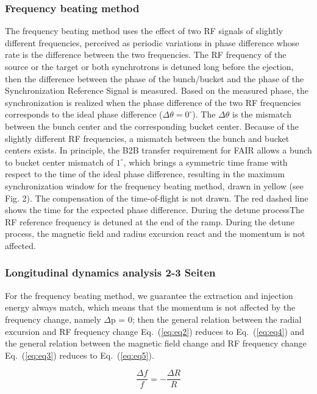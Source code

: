 \subsubsection{Frequency beating method}
The frequency beating method uses the effect of two RF signals of slightly different frequencies, perceived as periodic variations in phase difference whose rate is the difference between the two frequencies. The RF frequency of the source or the target or both synchrotrons is detuned long before the ejection, then the difference between the phase of the bunch/bucket and the phase of the Synchronization Reference Signal is measured. Based on the measured phase, the synchronization is realized when the phase difference of the two RF frequencies corresponds to the ideal phase difference ($\Delta \theta = 0^\circ$). The $\Delta \theta$ is the mismatch between the bunch center and the corresponding bucket center. Because of the slightly different RF frequencies, a mismatch between the bunch and bucket centers exists. In principle, the B2B transfer requirement for FAIR allows a bunch to bucket center mismatch of $1^\circ$, which brings a symmetric time frame with respect to the time
of the ideal phase difference, resulting in the maximum synchronization window for the frequency beating method, drawn in yellow (see Fig. 2). The compensation of the time-of-flight is not drawn. The red dashed line shows the time for the expected phase difference.
During the detune processThe RF reference frequency is detuned at the end of the ramp. During the detune process, the magnetic field and radius excursion react and the momentum is not affected.
\subsubsection{Longitudinal dynamics analysis 2-3 Seiten}
For the frequency beating method, we guarantee the extraction and injection energy always match, which means that the momentum is not affected by the frequency change, namely $\Delta$p = 0; then the general relation between the radial excursion and RF frequency change Eq.~(\ref{eq:eq2}) reduces to Eq.~(\ref{eq:eq4}) and the general relation between the magnetic field change and RF frequency change Eq.~(\ref{eq:eq3}) reduces to Eq.~(\ref{eq:eq5}).

\begin{equation}
\frac{\Delta{f}}{f} = - \frac{\Delta{R}}{R}
\label{eq:eq4}
\end{equation}

